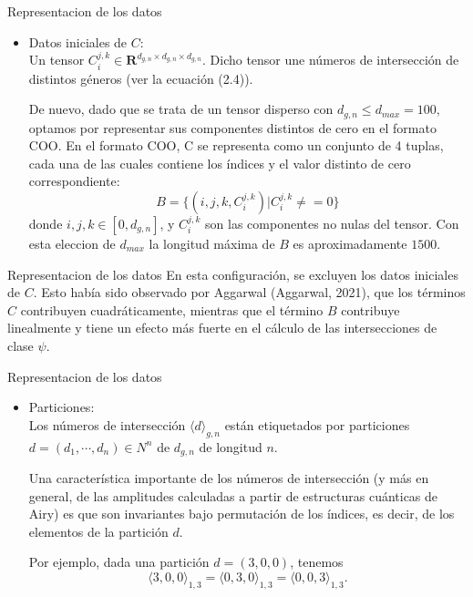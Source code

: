 \documentclass{beamer}
\begin{document}
\begin{frame}{Representacion de los datos}
    \begin{itemize}
        \item Datos iniciales de $C$: \\
        Un tensor $C_{i}^{j,k}\in \mathbf{R}^{d_{g,n}\times d_{g,n}\times d_{g,n}}$. 
        Dicho tensor une números de intersección de distintos géneros (ver la ecuación (2.4)). 
        \newline
        \pause
        
        De nuevo, dado que se trata de un tensor disperso con $d_{g,n} \leq d_{max} = 100$, optamos por representar sus componentes distintos de cero en el formato COO. En el formato COO, C se representa como un conjunto de 4 tuplas, cada una de las cuales contiene los índices y el valor distinto de cero correspondiente:
        $$B=\{ (i,j,k,C_{i}^{j,k}) | C_{i}^{j,k}\neq = 0 \}$$
        donde $i, j, k \in [0, d_{g,n} ]$, y $C_{i}^{j,k}$ son las componentes no nulas del tensor. Con esta eleccion de $d_{max}$ la longitud máxima de $B$ es aproximadamente $1500$.
    \end{itemize}
\end{frame}

\begin{frame}{Representacion de los datos}
    En esta configuración, se excluyen los datos iniciales de $C$. Esto había sido observado por Aggarwal (Aggarwal, 2021), que los términos $C$ contribuyen cuadráticamente, mientras que el término $B$ contribuye linealmente y tiene un efecto más fuerte en el cálculo de las intersecciones de clase $\psi$.
\end{frame}

\begin{frame}{Representacion de los datos}
    \begin{itemize}
        \item Particiones:\\
        Los números de intersección $\langle d \rangle_{g,n}$ están etiquetados por particiones $d = (d_1,\cdots, d_n) \in N^{n}$ de $d_{g,n}$ de longitud $n$. 
        \newline
        \pause
        
        Una característica importante de los números de intersección (y más en general, de las amplitudes calculadas a partir de estructuras cuánticas de Airy) es que son invariantes bajo permutación de los índices, es decir, de los elementos de la partición $d$. 
        \newline
        \pause
        
        Por ejemplo, dada una partición $d = (3,0,0)$, tenemos $$\langle 3,0,0 \rangle_{1,3} = \langle 0,3,0 \rangle_{1,3} = \langle 0,0,3 \rangle_{1,3}.$$
    \end{itemize}
\end{frame}
\end{document}
